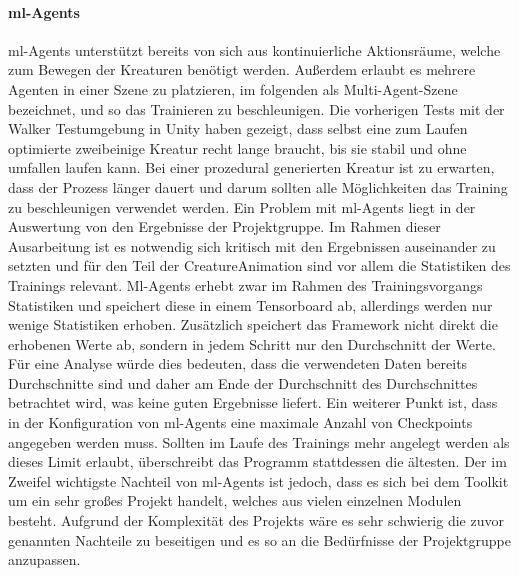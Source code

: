 \paragraph{ml-Agents}\fup
\noindent ml-Agents unterstützt bereits von sich aus kontinuierliche Aktionsräume, welche zum Bewegen der Kreaturen benötigt werden. Außerdem erlaubt es mehrere Agenten in einer Szene zu platzieren, im folgenden als Multi-Agent-Szene bezeichnet, und so das Trainieren zu beschleunigen. Die vorherigen Tests mit der Walker Testumgebung in Unity \cite{walkerEnv} haben gezeigt, dass selbst eine zum Laufen optimierte zweibeinige Kreatur recht lange braucht, bis sie stabil und ohne umfallen laufen kann.
Bei einer prozedural generierten Kreatur ist zu erwarten, dass der Prozess länger dauert und darum sollten alle Möglichkeiten das Training zu beschleunigen verwendet werden.
Ein Problem mit ml-Agents liegt in der Auswertung von den Ergebnisse der Projektgruppe. Im Rahmen dieser Ausarbeitung ist es notwendig sich kritisch mit den Ergebnissen auseinander zu setzten und für den Teil der CreatureAnimation sind vor allem die Statistiken des Trainings relevant. Ml-Agents erhebt zwar im Rahmen des Trainingsvorgangs Statistiken und speichert diese in einem Tensorboard ab, allerdings werden nur wenige Statistiken erhoben. Zusätzlich speichert das Framework nicht direkt die erhobenen Werte ab, sondern in jedem Schritt nur den Durchschnitt der Werte. Für eine Analyse würde dies bedeuten, dass die verwendeten Daten bereits Durchschnitte sind und daher am Ende der Durchschnitt des Durchschnittes betrachtet wird, was keine guten Ergebnisse liefert. 
Ein weiterer Punkt ist, dass in der Konfiguration von ml-Agents eine maximale Anzahl von Checkpoints angegeben werden muss. Sollten im Laufe des Trainings mehr angelegt werden als dieses Limit erlaubt, überschreibt das Programm stattdessen die ältesten.
Der im Zweifel wichtigste Nachteil von ml-Agents ist jedoch, dass es sich bei dem Toolkit um ein sehr großes Projekt handelt, welches aus vielen einzelnen Modulen besteht. Aufgrund der Komplexität des Projekts wäre es sehr schwierig die zuvor genannten Nachteile zu beseitigen und es so an die Bedürfnisse der Projektgruppe anzupassen.\\
